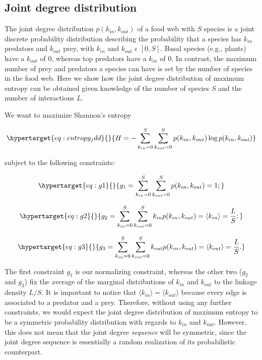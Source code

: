 \documentclass[11pt]{article}
\begin{document}
\hypertarget{joint-degree-distribution}{%
\subsection{Joint degree distribution}\label{joint-degree-distribution}}

The joint degree distribution \(p(k_{in},k_{out})\) of a food web with
\(S\) species is a joint discrete probability distribution describing
the probability that a species has \(k_{in}\) predators and \(k_{out}\)
prey, with \(k_{in}\) and \(k_{out}\) \(\epsilon\) \([0, S]\). Basal
species (e.g., plants) have a \(k_{out}\) of \(0\), whereas top
predators have a \(k_{in}\) of \(0\). In contrast, the maximum number of
prey and predators a species can have is set by the number of species in
the food web. Here we show how the joint degree distribution of maximum
entropy can be obtained given knowledge of the number of species \(S\)
and the number of interactions \(L\).

We want to maximize Shannon's entropy

\begin{equation}\protect\hypertarget{eq:entropy_jdd}{}{H = -\sum_{k_{in}=0}^S\sum_{k_{out}=0}^S p(k_{in},k_{out}) \log p(k_{in},k_{out})}\label{eq:entropy_jdd}\end{equation}

subject to the following constraints:

\begin{equation}\protect\hypertarget{eq:g1}{}{g_1 = \sum_{k_{in}=0}^S\sum_{k_{out}=0}^S p(k_{in},k_{out}) = 1;}\label{eq:g1}\end{equation}

\begin{equation}\protect\hypertarget{eq:g2}{}{g_2 = \sum_{k_{in}=0}^S\sum_{k_{out}=0}^S k_{in} p(k_{in},k_{out}) = \langle k_{in} \rangle = \frac{L}{S};}\label{eq:g2}\end{equation}

\begin{equation}\protect\hypertarget{eq:g3}{}{g_3 = \sum_{k_{in}=0}^S\sum_{k_{out}=0}^S k_{out} p(k_{in},k_{out}) = \langle k_{out} \rangle = \frac{L}{S}.}\label{eq:g3}\end{equation}

The first constraint \(g_1\) is our normalizing constraint, whereas the
other two (\(g_2\) and \(g_3\)) fix the average of the marginal
distributions of \(k_{in}\) and \(k_{out}\) to the linkage density
\(L/S\). It is important to notice that
\(\langle k_{in} \rangle = \langle k_{out} \rangle\) because every edge
is associated to a predator and a prey. Therefore, without using any
further constraints, we would expect the joint degree distribution of
maximum entropy to be a symmetric probability distribution with regards
to \(k_{in}\) and \(k_{out}\). However, this does not mean that the
joint degree \emph{sequence} will be symmetric, since the joint degree
sequence is essentially a random realization of its probabilistic
counterpart.
\end{document}

